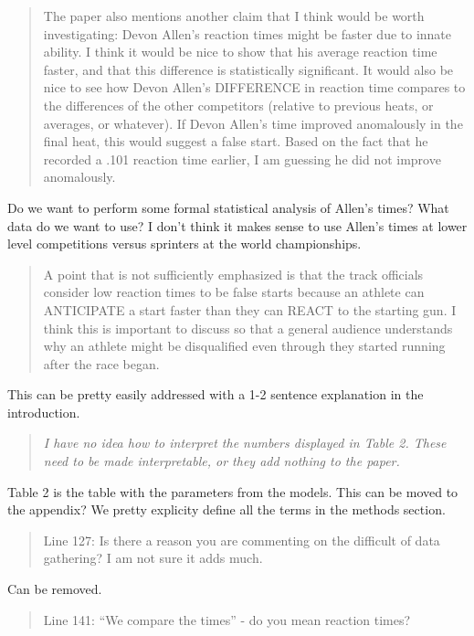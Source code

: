 \documentclass[12pt]{article}
\newenvironment{comment}%
{\begin{quotation}\noindent\small\it\color{darkblue}\ignorespaces%
}{\end{quotation}}
\begin{document}
\begin{comment}
The paper also mentions another claim that I think would be worth investigating:
Devon Allen’s reaction times might be faster due to innate ability. I think it
would be nice to show that his average reaction time faster, and that this
difference is statistically significant. It would also be nice to see how Devon
Allen’s DIFFERENCE in reaction time compares to the differences of the other
competitors (relative to previous heats, or averages, or whatever). If Devon
Allen’s time improved anomalously in the final heat, this would suggest a false
start. Based on the fact that he recorded a .101 reaction time earlier, I am
guessing he did not improve anomalously.  
\end{comment}

Do we want to perform some formal statistical analysis of Allen's times? What
data do we want to use? I don't think it makes sense to use Allen's times at
lower level competitions versus sprinters at the world championships.

\begin{comment}
A point that is not sufficiently emphasized is that the track officials consider
low reaction times to be false starts because an athlete can ANTICIPATE a start
faster than they can REACT to the starting gun. I think this is important to
discuss so that a general audience understands why an athlete might be
disqualified even through they started running after the race began.  
\end{comment}

This can be pretty easily addressed with a 1-2 sentence explanation in the
introduction.

\begin{comment}I have no idea how to interpret the numbers displayed in Table 2. These
need to be made interpretable, or they add nothing to the paper.
\end{comment}

Table 2 is the table with the parameters from the models.  This can be moved to
the appendix? We pretty explicity define all the terms in the methods section.

\begin{comment}
Line 127: Is there a reason you are commenting on the difficult of data
gathering? I am not sure it adds much.
\end{comment}

Can be removed.

\begin{comment}
Line 141: “We compare the times” - do you mean reaction times?
\end{comment}
\end{document}
